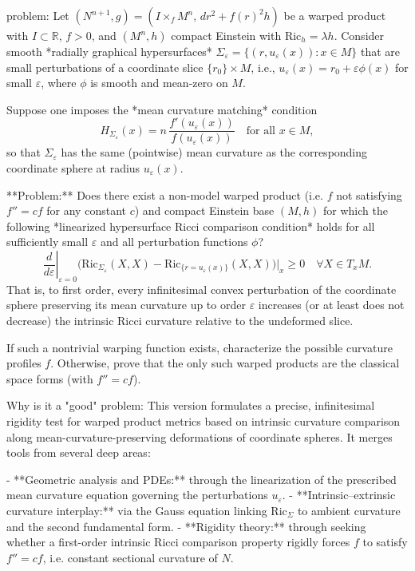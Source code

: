 problem:  
Let \( (N^{n+1}, g) = (I \times_f M^n,\, dr^2 + f(r)^2 h) \) be a warped product with \(I \subset \mathbb{R}\), \(f>0\), and \((M^n, h)\) compact Einstein with \(\mathrm{Ric}_h = \lambda h\).  
Consider smooth *radially graphical hypersurfaces* \(\Sigma_\varepsilon = \{(r,u_\varepsilon(x)) : x\in M\}\) that are small perturbations of a coordinate slice \(\{r_0\}\times M\), i.e., \(u_\varepsilon(x) = r_0 + \varepsilon\phi(x)\) for small \(\varepsilon\), where \(\phi\) is smooth and mean-zero on \(M\).  

Suppose one imposes the *mean curvature matching* condition
\[
H_{\Sigma_\varepsilon}(x) = n\,\frac{f'(u_\varepsilon(x))}{f(u_\varepsilon(x))}
\quad \text{for all } x \in M,
\]
so that \(\Sigma_\varepsilon\) has the same (pointwise) mean curvature as the corresponding coordinate sphere at radius \(u_\varepsilon(x)\).  

**Problem:**  
Does there exist a non-model warped product (i.e. \(f\) not satisfying \(f'' = c f\) for any constant \(c\)) and compact Einstein base \((M, h)\) for which the following *linearized hypersurface Ricci comparison condition* holds for all sufficiently small \(\varepsilon\) and all perturbation functions \(\phi\)?  
\[
\left.\frac{d}{d\varepsilon}\right|_{\varepsilon=0}
\Big(
\mathrm{Ric}_{\Sigma_\varepsilon}(X,X)
- \mathrm{Ric}_{\{r=u_\varepsilon(x)\}}(X,X)
\Big)
\Big|_{x} \ge 0
\quad \forall X\in T_xM.
\]
That is, to first order, every infinitesimal convex perturbation of the coordinate sphere preserving its mean curvature up to order \(\varepsilon\) increases (or at least does not decrease) the intrinsic Ricci curvature relative to the undeformed slice.  

If such a nontrivial warping function exists, characterize the possible curvature profiles \(f\).  
Otherwise, prove that the only such warped products are the classical space forms (with \(f''=c f\)).  

Why is it a "good" problem:  
This version formulates a precise, infinitesimal rigidity test for warped product metrics based on intrinsic curvature comparison along mean-curvature-preserving deformations of coordinate spheres. It merges tools from several deep areas:

- **Geometric analysis and PDEs:** through the linearization of the prescribed mean curvature equation governing the perturbations \(u_\varepsilon\).  
- **Intrinsic–extrinsic curvature interplay:** via the Gauss equation linking \(\mathrm{Ric}_\Sigma\) to ambient curvature and the second fundamental form.  
- **Rigidity theory:** through seeking whether a first-order intrinsic Ricci comparison property rigidly forces \(f\) to satisfy \(f'' = c f\), i.e. constant sectional curvature of \(N\).  

